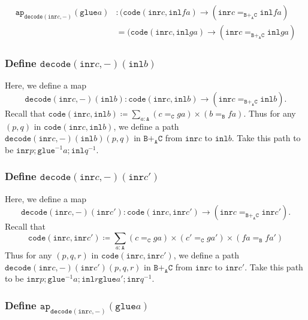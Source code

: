 \documentclass[12pt]{amsart}
\newcommand{\from}{\colon}
\newcommand{\inv}{^{-1}}
\newcommand{\type}[1]{\mathtt{#1}}
\newcommand{\tin}{\colon}
\newcommand{\A}{\type{A}}
\newcommand{\B}{\type{B}}
\newcommand{\C}{\type{C}}
\newcommand{\BAC}{\B +_{\A} \C}
\newcommand{\ap}{\type{ap}}
\newcommand{\inl}{\type{inl}}
\newcommand{\inr}{\type{inr}}
\newcommand{\glue}{\type{glue}}
\newcommand{\code}{\type{code}}
\newcommand{\decode}{\type{decode}}
\theoremstyle{remark}
\theoremstyle{definition}
\begin{document}
\begin{align*}
  \ap_{\decode ( \inr c , - )} (\glue a) &
  \tin
  ( \code ( \inr c , \inl fa ) \to ( \inr c =_{\BAC} \inl fa ) \\
  & =
  ( \code ( \inr c , \inl ga ) \to ( \inr c =_{\BAC} \inl ga )
\end{align*}

\subsubsection{Define \( \decode ( \inr c , - ) ( \inl b ) \)} %

Here, we define a map
\[
  \decode ( \inr c , - ) ( \inl b )
  \from
  \code ( \inr c , \inl b )
  \to
  ( \inr c =_{\BAC} \inl b ).
\]
Recall that \( \code ( \inr c , \inl b ) \coloneqq \sum\limits_{a \tin
\A} ( c =_{\C} ga ) \times ( b =_{\B} fa ) \). Thus for any \( ( p,q )
\) in \( \code ( \inr c , \inl b ) \), we define a path \( \decode (
\inr c , - ) ( \inl b ) ( p,q ) \) in \( \BAC \) from \( \inr c \) to
\( \inl b \).  Take this path to be \( \inr p ; \glue^{-1}  a ; \inl q^{-1} \).

\subsubsection{Define \( \decode ( \inr c , - ) ( \inr c' ) \)} %

Here, we define a map
\[
  \decode ( \inr c , - ) ( \inr c' )
  \from
  \code ( \inr c , \inr c' )
  \to
  ( \inr c =_{\BAC} \inr c' ).
\]
Recall that
\[
  \code ( \inr c , \inr c' ) \coloneqq
  \sum\limits_{a \tin \A}
  ( c =_{\C} ga ) \times ( c' =_{\C} ga' ) \times ( fa =_{\B} fa' ) 
\]
Thus for any \( ( p,q,r ) \) in \( \code ( \inr c , \inr c' ) \), we define a path \( \decode (
\inr c , - ) ( \inr c' ) ( p,q,r ) \) in \( \BAC \) from \( \inr c \) to
\( \inr c' \).  Take this path to be \( \inr p ; \glue\inv a ; \inl r
\glue a' ; \inr q\inv \).

\subsubsection{Define \( \ap_{\decode ( \inr c , - )} (\glue a) \)} %
\end{document}
